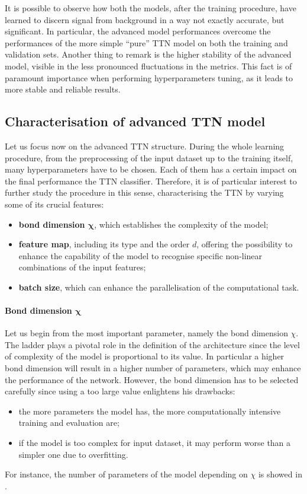 \documentclass[../main/main.tex]{subfiles}
\begin{document}
It is possible to observe how both the models, after the training procedure, have learned to discern signal from background in a way not exactly accurate, but significant. In particular, the advanced model performances overcome the performances of the more simple ``pure'' TTN model on both the training and validation sets. Another thing to remark is the higher stability of the advanced model, visible in the less pronounced fluctuations in the metrics. This fact is of paramount importance when performing hyperparameters tuning, as it leads to more stable and reliable results.



\subsection{Characterisation of advanced TTN model}
\label{ssec:results_characterisation}

Let us focus now on the advanced TTN structure. During the whole learning procedure, from the preprocessing of the input dataset up to the training itself, many hyperparameters have to be chosen. Each of them has a certain impact on the final performance the TTN classifier. Therefore, it is of particular interest to further study the procedure in this sense, characterising the TTN by varying some of its crucial features:
\begin{itemize}
    \item \textbf{bond dimension \( \boldsymbol{\chi} \)}, which establishes the complexity of the model;
    \item \textbf{feature map}, including its type and the order \( d \), offering the possibility to enhance the capability of the model to recognise specific non-linear combinations of the input features;
    \item \textbf{batch size}, which can enhance the parallelisation of the computational task.
\end{itemize}


\paragraph{Bond dimension \( \boldsymbol{\chi} \)}
Let us begin from the most important parameter, namely the bond dimension \( \chi \). The ladder plays a pivotal role in the definition of the architecture since the level of complexity of the model is proportional to its value. In particular a higher bond dimension will result in a higher number of parameters, which may enhance the performance of the network. However, the bond dimension has to be selected carefully since using a too large value enlightens his drawbacks:
\begin{itemize}
    \item the more parameters the model has, the more computationally intensive training and evaluation are;
    \item if the model is too complex for input dataset, it may perform worse than a simpler one due to overfitting.
\end{itemize}
For instance, the number of parameters of the model depending on \( \chi \) is showed in .
\end{document}
